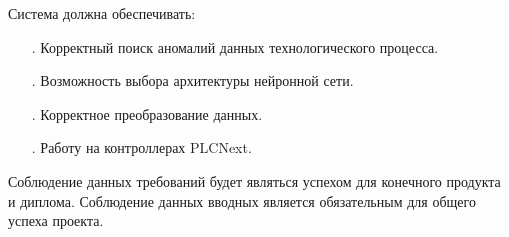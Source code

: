 {\begin{itemize}[leftmargin=2.15cm, labelwidth=0.65cm, labelsep=0.0cm]
		\setcounter{itemcntr}{1}
	\end{itemize} 	

	\par \redline Система должна обеспечивать:
	
	\begin{itemize}[leftmargin=2.15cm, labelwidth=0.65cm, labelsep=0.0cm] 
		\item[\theitemcntr. ] Корректный поиск аномалий данных технологического процесса.
		\addtocounter{itemcntr}{1}
		
		\item[\theitemcntr. ] Возможность выбора архитектуры нейронной сети.		
		\addtocounter{itemcntr}{1}
		
		\item[\theitemcntr. ] Корректное преобразование данных.		
		\addtocounter{itemcntr}{1}
		
		\item[\theitemcntr. ] Работу на контроллерах PLCNext. 		
		\addtocounter{itemcntr}{1}
		
		\setcounter{itemcntr}{1}
	\end{itemize} 	
	
	\par \redline Соблюдение данных требований будет являться успехом для конечного продукта и диплома. Соблюдение данных вводных является обязательным для общего успеха проекта. 
	
	\par 
}

%



\setcounter{subchaptercntr}{1}
\setcounter{formulacntr}{1}
\setcounter{imagecntr}{1}
\setcounter{tablecntr}{1}


